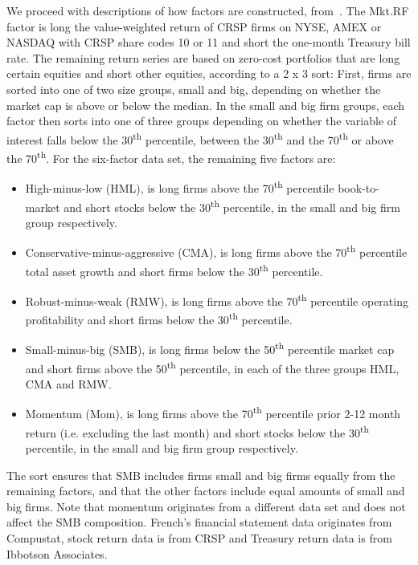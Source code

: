 We proceed with descriptions of how factors are constructed, from~\textcite{FrenchData}. The Mkt.RF factor is long the value-weighted return of CRSP firms on NYSE, AMEX or NASDAQ with CRSP share codes 10 or 11 and short the one-month Treasury bill rate. The remaining return series are based on zero-cost portfolios that are long certain equities and short other equities, according to a 2 x 3 sort: First, firms are sorted into one of two size groups, small and big, depending on whether the market cap is above or below the median. In the small and big firm groups, each factor then sorts into one of three groups depending on whether the variable of interest falls below the 30\textsuperscript{th} percentile, between the 30\textsuperscript{th} and the 70\textsuperscript{th} or above the 70\textsuperscript{th}. For the six-factor data set, the remaining five factors are:
\begin{itemize}
  \item High-minus-low (HML), is long firms above the 70\textsuperscript{th} percentile book-to-market and short stocks below the 30\textsuperscript{th} percentile, in the small and big firm group respectively.
  \item Conservative-minus-aggressive (CMA), is long firms above the 70\textsuperscript{th} percentile total asset growth and short firms below the 30\textsuperscript{th} percentile. 
  \item Robust-minus-weak (RMW), is long firms above the 70\textsuperscript{th} percentile operating profitability and short firms below the 30\textsuperscript{th} percentile. 
  \item Small-minus-big (SMB), is long firms below the 50\textsuperscript{th} percentile market cap and short firms above the 50\textsuperscript{th} percentile, in each of the three groups HML, CMA and RMW.
  \item Momentum (Mom), is long firms above the 70\textsuperscript{th} percentile prior 2-12 month return (i.e. excluding the last month) and short stocks below the 30\textsuperscript{th} percentile, in the small and big firm group respectively.
\end{itemize}
The sort ensures that SMB includes firms small and big firms equally from the remaining factors, and that the other factors include equal amounts of small and big firms. Note that momentum originates from a different data set and does not affect the SMB composition. French's financial statement data originates from Compustat, stock return data is from CRSP and Treasury return data is from Ibbotson Associates.

